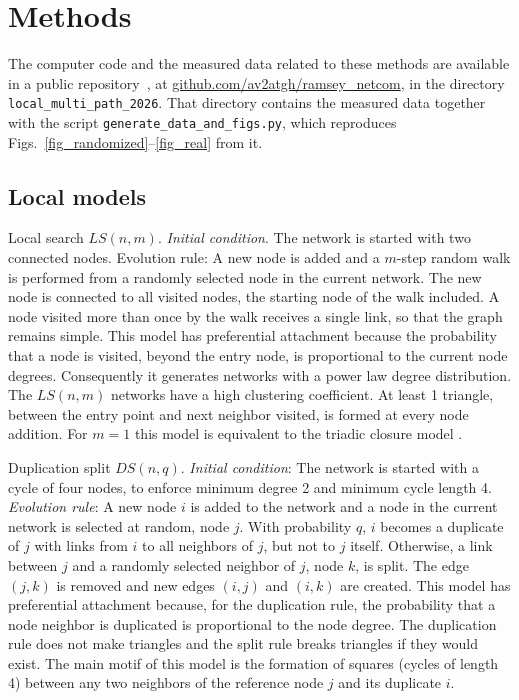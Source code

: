 \documentclass[reprint,aps,pre,amsmath,amssymb,superscriptaddress,showpacs]{revtex4-1}
\begin{document}
\section{Methods}
\label{methods}

The computer code and the measured data related to these methods are available in a public repository~\cite{vazquez2026multipathdata}, at \href{https://github.com/av2atgh/ramsey_netcom/tree/master/local_multi_path_2026}{github.com/av2atgh/ramsey\_netcom}, in the directory \verb|local_multi_path_2026|. That directory contains the measured data together with the script \verb|generate_data_and_figs.py|, which reproduces Figs.~\ref{fig_randomized}--\ref{fig_real} from it.

\subsection{Local models}

Local search $LS(n, m)$. {\em Initial condition}. The network is started with two connected nodes. Evolution rule: A new node is added and a $m$-step random walk is performed from a randomly selected node in the current network. The new node is connected to all visited nodes, the starting node of the walk included. A node visited more than once by the walk receives a single link, so that the graph remains simple. This model has preferential attachment because the probability that a node is visited, beyond the entry node, is proportional to the current node degrees. Consequently it generates networks with a power law degree distribution. The $LS(n, m)$ networks have a
high clustering coefficient. At least 1 triangle, between the entry point and next neighbor visited, is formed at every node addition. For $m=1$ this model is equivalent to the triadic closure model \cite{growing_social_networks_jin01, communities_bianconi_2014}.

Duplication split $DS(n, q)$. {\em Initial condition}: The network is started with a cycle of four nodes, to enforce minimum degree 2 and minimum cycle length 4. {\em Evolution rule}: A new node $i$ is added to the network and a node in the current network is selected at random, node $j$. With probability $q$, $i$ becomes a duplicate of $j$ with links from $i$ to all neighbors of $j$, but not to $j$ itself. Otherwise, a link between $j$ and a randomly selected neighbor of $j$, node $k$, is split. The edge $(j, k)$ is removed and new edges $(i, j)$ and $(i, k)$ are created. This model has preferential attachment because, for the duplication rule, the probability that a node neighbor is duplicated is proportional to the node degree. The duplication rule does not make triangles and the split rule breaks triangles if they would exist. The main motif of this model is the formation of squares (cycles of length 4) between any two neighbors of the reference node $j$ and its duplicate $i$.
\end{document}
